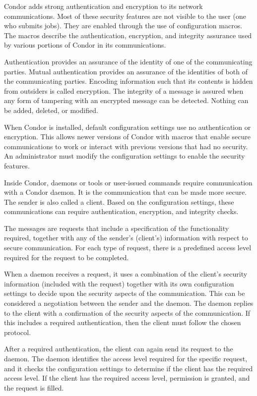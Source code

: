 Condor adds strong authentication and encryption to its network
communications.
Most of these security features are not visible to the user
(one who submits jobs).
They are enabled through the use of configuration macros.
The macros describe the authentication, encryption, and
integrity assurance used by various portions of Condor in its communications.

Authentication provides an assurance of the identity of one of the
communicating parties.
Mutual authentication provides an assurance of the identities of
both of the communicating parties.
Encoding information such that its contents is hidden from outsiders
is called encryption.
The integrity of a message is assured when any form of
tampering with an encrypted message can be detected. 
Nothing can be added, deleted, or modified.

When Condor is installed, default configuration settings
use no authentication or encryption.
This allows newer versions of Condor with macros
that enable secure communications to work or interact
with previous versions that had no security.
An administrator must modify the configuration settings to
enable the security features.

Inside Condor, daemons or tools or user-issued commands
require communication with a Condor daemon.
It is the communication that can be made more secure.
The sender is also called a client.
Based on the configuration settings,
these communications can require authentication, encryption,
and integrity checks.

The messages are requests that include
a specification of the functionality required,
together with any of the sender's (client's) information with
respect to secure communication.
For each type of request, there is a predefined access level
required for the request to be completed.

When a daemon receives a request,
it uses a combination of the client's security information
(included with the request)
together with its own configuration settings to decide upon
the security aspects of the communication.
This can be considered a negotiation between the sender and
the daemon.
The daemon replies to the client with a confirmation of
the security aspects of the communication.
If this includes a required authentication, then the
client must follow the chosen protocol.

After a required authentication, the client can again send its
request to the daemon. 
The daemon identifies the access level required for the specific
request,
and it checks the configuration settings to determine if the client 
has the required access level.
If the client has the required access level,
permission is granted, and the request is filled. 

